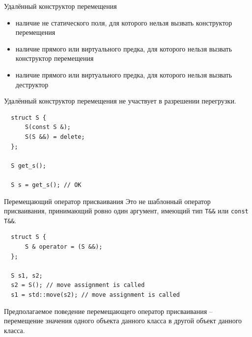 \documentclass[unknownkeysallowed,xcolor=table]{beamer}
\begin{document}
\begin{frame}[fragile]{Удалённый конструктор перемещения}
  \begin{itemize}
    \item наличие не статического поля, для которого нельзя вызвать конструктор перемещения \vspace{0.5em}
    \item наличие прямого или виртуального предка, для которого нельзя вызвать конструктор перемещения \vspace{0.5em}
    \item наличие прямого или виртуального предка, для которого нельзя вызвать деструктор
  \end{itemize}

  \vspace{1em}

  Удалённый конструктор перемещения не участвует в разрешении перегрузки.
  \begin{lstlisting}
  struct S {
      S(const S &);
      S(S &&) = delete;
  };

  S get_s();

  S s = get_s(); // OK
  \end{lstlisting}
\end{frame}

\begin{frame}[fragile]{Перемещающий оператор присваивания}
  Это не шаблонный оператор присваивания, принимающий ровно один аргумент, имеющий тип \lstinline{T&&} или \lstinline{const T&&}.

  \vspace{1em}

  \begin{lstlisting}
  struct S {
      S & operator = (S &&);
  };

  S s1, s2;
  s2 = S(); // move assignment is called
  s1 = std::move(s2); // move assignment is called
  \end{lstlisting}
  \vspace{1em}

  Предполагаемое поведение перемещающего оператор присваивания -- перемещение значения одного объекта данного класса в другой объект данного класса.
\end{frame}
\end{document}
